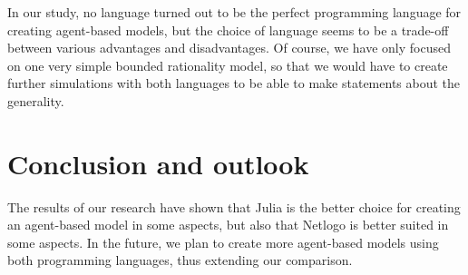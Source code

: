 \documentclass[runningheads]{llncs}
\begin{document}
In our study, no language turned out to be the perfect programming
language for creating agent-based models, but the choice of language
seems to be a trade-off between various advantages and disadvantages. Of
course, we have only focused on one very simple bounded rationality
model, so that we would have to create further simulations with both
languages to be able to make statements about the generality.

\hypertarget{conclusion-and-outlook}{%
\section{Conclusion and outlook}\label{conclusion-and-outlook}}

The results of our research have shown that Julia is the better choice
for creating an agent-based model in some aspects, but also that Netlogo
is better suited in some aspects. In the future, we plan to create more
agent-based models using both programming languages, thus extending our
comparison.


%
%
%
%
%
\printbibliography
\end{document}
